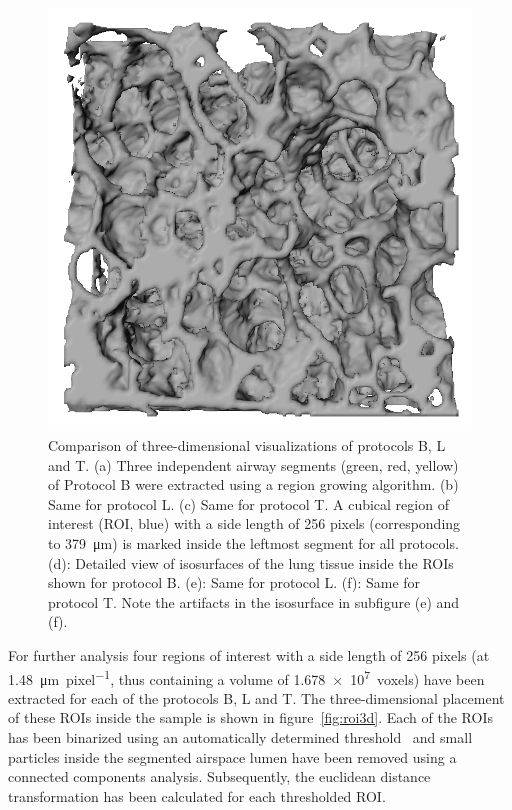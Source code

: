 \begin{figure}[htp]
		\includegraphics[width=\imagewidth]{img/comparisonBvsT/roiT}%
		\caption{%
			Comparison of three-dimensional visualizations of protocols B, L and T. %
			(a) Three independent airway segments (green, red, yellow) of Protocol B were extracted using a region growing algorithm. %
			(b) Same for protocol L. %
			(c) Same for protocol T. A cubical region of interest (ROI, blue) with a side length of 256 pixels (corresponding to \SI{379}{\micro\meter}) is marked inside the leftmost segment for all protocols. %
			(d): Detailed view of isosurfaces of the lung tissue inside the ROIs shown for protocol B. %
			(e): Same for protocol L.
			(f): Same for protocol T. Note the artifacts in the isosurface in subfigure (e) and (f).%
			}%
		\label{fig:BvsT}%
	\end{figure}
\fi%

For further analysis four regions of interest with a side length of 256 pixels (at \SI{1.48}{\micro\meter\per pixel}, thus containing a volume of \SI{1.678e7}{voxels}) have been extracted for each of the protocols B, L and T. The three-dimensional placement of these ROIs inside the sample is shown in figure~\ref{fig:roi3d}. Each of the ROIs has been binarized using an automatically determined threshold~\cite{Otsu1979} and small particles inside the segmented airspace lumen have been removed using a connected components analysis. Subsequently, the euclidean distance transformation has been calculated for each thresholded ROI.

